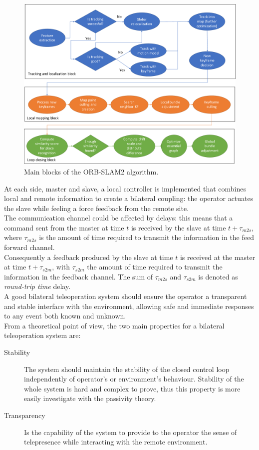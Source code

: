 \begin{figure}
	\centering
	\includegraphics[width=1.00\linewidth]{images/orb-slam-overview}
	\caption{Main blocks of the ORB-SLAM2 algorithm.}
	\label{fig:orbslam}
\end{figure}

At each side, master and slave, a local controller is implemented that combines local and remote information to create a bilateral coupling: the operator actuates the slave while feeling a force feedback from the remote site.\\
The communication channel could be affected by delays: this means that a command sent from the master at time $t$ is received by the slave at time $t + \tau_{m2s}$, where $\tau_{m2s}$ is the amount of time required to transmit the information in the feed forward channel.\\
Consequently a feedback produced by the slave at time $t$ is received at the master at time $t+ \tau_{s2m}$, with $\tau_{s2m}$ the amount of time required to transmit the information in the feedback channel. The sum of  $\tau_{m2s}$ and $\tau_{s2m}$ is denoted as \textit{round-trip time} delay.\\
A good bilateral teleoperation system should ensure the operator a transparent and stable interface with the environment, allowing safe and immediate responses to any event both known and unknown.\\

From a theoretical point of view, the two main properties for a bilateral teleoperation system are:
\begin{description}
	\item[Stability] The system should maintain the stability of the closed control loop independently of operator's or environment's behaviour. Stability of the whole system is hard and complex to prove, thus this property is more easily investigate with the passivity theory.
	\item[Transparency] Is the capability of the system to provide to the operator the sense of telepresence while interacting with the remote environment. 
\end{description}

